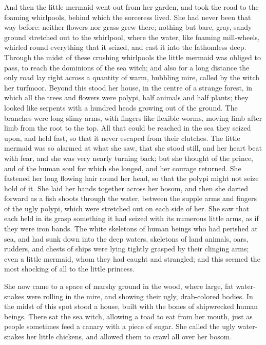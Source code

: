 And then the little mermaid went out from her garden, and took the road to the foaming whirlpools, behind which the sorceress lived.
She had never been that way before: neither flowers nor grass grew there; nothing but bare, gray, sandy ground stretched out to the whirlpool, where the water, like foaming mill-wheels, whirled round everything that it seized, and cast it into the fathomless deep.
Through the midst of these crushing whirlpools the little mermaid was obliged to pass, to reach the dominions of the sea witch; and also for a long distance the only road lay right across a quantity of warm, bubbling mire, called by the witch her turfmoor.
Beyond this stood her house, in the centre of a strange forest, in which all the trees and flowers were polypi, half animals and half plants; they looked like serpents with a hundred heads growing out of the ground.
The branches were long slimy arms, with fingers like flexible worms, moving limb after limb from the root to the top.
All that could be reached in the sea they seized upon, and held fast, so that it never escaped from their clutches.
The little mermaid was so alarmed at what she saw, that she stood still, and her heart beat with fear, and she was very nearly turning back; but she thought of the prince, and of the human soul for which she longed, and her courage returned.
She fastened her long flowing hair round her head, so that the polypi might not seize hold of it.
She laid her hands together across her bosom, and then she darted forward as a fish shoots through the water, between the supple arms and fingers of the ugly polypi, which were stretched out on each side of her.
She saw that each held in its grasp something it had seized with its numerous little arms, as if they were iron bands.
The white skeletons of human beings who had perished at sea, and had sunk down into the deep waters, skeletons of land animals, oars, rudders, and chests of ships were lying tightly grasped by their clinging arms; even a little mermaid, whom they had caught and strangled; and this seemed the most shocking of all to the little princess.

She now came to a space of marshy ground in the wood, where large, fat water-snakes were rolling in the mire, and showing their ugly, drab-colored bodies.
In the midst of this spot stood a house, built with the bones of shipwrecked human beings.
There sat the sea witch, allowing a toad to eat from her mouth, just as people sometimes feed a canary with a piece of sugar.
She called the ugly water-snakes her little chickens, and allowed them to crawl all over her bosom.

